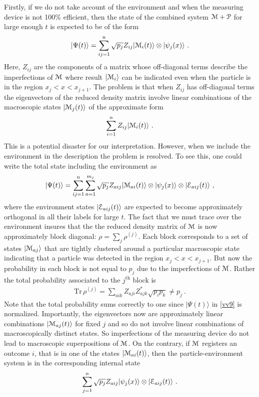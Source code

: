 \documentclass[12pt]{article}
\def\BP{{\EuScript P}}
\def\BM{{\EuScript M}}
\def\BE{{\EuScript E}}
\def\ket#1{| #1\rangle}
\newcommand{\EQ}[1]{\begin{equation}\begin{split} #1
\end{split}\end{equation}}
\begin{document}
Firstly, if we do not take account of the environment and when the measuring device is not 100\% efficient, then  the state of the combined system
$\BM+\BP$ for large enough $t$ is expected to be of the form
\EQ{
\ket{\Psi(t)}=\sum_{ij=1}^n\sqrt{p_j}Z_{ij}\ket{\BM_i(t)}\otimes\ket{\psi_j(x)}\ .
\label{vv6}
}
Here, $Z_{ij}$ are the components of a matrix whose off-diagonal terms describe the imperfections of $\BM$ where result $\ket{\BM_i}$ can be indicated even when the particle is in the region $x_j<x<x_{j+1}$. The problem is that when $Z_{ij}$ has off-diagonal terms the eigenvectors of the reduced density matrix involve linear combinations of the macroscopic states $\ket{\BM_j(t)}$ of the approximate form
\EQ{
\sum_{i=1}^nZ_{ij}\ket{\BM_i(t)}\ .
}
This is a potential disaster for our interpretation.
However, when we include the environment in the description the problem is resolved. To see this, one could write the total state including the environment as
\EQ{
\ket{\Psi(t)}=\sum_{ij=1}^n\sum_{a=1}^{m_j}\sqrt{p_j}Z_{aij}\ket{\BM_{ai}(t)}\otimes\ket{\psi_j(x)}\otimes\ket{\BE_{aij}(t)}\ ,
\label{vv9}
}
where the environment states $\ket{\BE_{aij}(t)}$ are expected to become approximately orthogonal in all their labels for large $t$. The fact that we must trace over the environment insures that the 
the reduced density matrix of $\BM$ is now approximately block diagonal: $\rho=\sum_j\rho^{(j)}$. Each block corresponds to a set of states $\ket{\BM_{aj}}$ that are tightly clustered around
a particular macroscopic state indicating that a particle was detected in the region $x_j<x<x_{j+1}$. But now the probability in each block is not equal to $p_j$ due to the imperfections of $\BM$. Rather the total probability associated to the $j^\text{th}$ block is
\EQ{
\text{Tr}\,\rho^{(j)}=\sum_{aik}Z_{aji}Z_{ajk}^*\sqrt{p_ip_k}\neq p_j\ .
}
Note that the total probability sums correctly to one since $\ket{\Psi(t)}$ in \eqref{vv9} is normalized. Importantly, the eigenvectors now are approximately linear combinations $\ket{\BM_{aj}(t)}$ for fixed $j$ and so do not involve linear combinations of macroscopically distinct states. So imperfections of the measuring device do not lead to macroscopic superpositions of $\BM$. On the contrary, if $\BM$ registers an outcome $i$, that is in one of the states $\ket{\BM_{ai}(t)}$,  then the particle-environment system is in the corresponding internal state
\EQ{
\sum_{j=1}^n\sqrt{p_j}Z_{aij}\ket{\psi_j(x)}\otimes \ket{\BE_{aij}(t)}\ .
}
\end{document}
